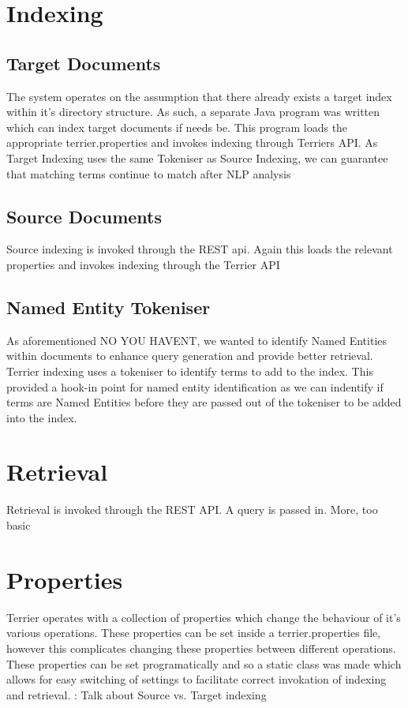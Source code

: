 \documentclass{l4proj}
\begin{document}
\section{Indexing}
\subsection{Target Documents}
The system operates on the assumption that there already exists a target index within it's directory structure.
As such, a separate Java program was written which can index target documents if needs be. This program loads the appropriate terrier.properties and invokes indexing through Terriers API. As Target Indexing uses the same Tokeniser as Source Indexing, we can guarantee that matching terms continue to match after NLP analysis

\subsection{Source Documents}
Source indexing is invoked through the REST api. Again this loads the relevant properties and invokes indexing through the Terrier API

\subsection{Named Entity Tokeniser}
As aforementioned NO YOU HAVENT, we wanted to identify Named Entities within documents to enhance query generation and provide better retrieval. Terrier indexing uses a tokeniser to identify terms to add to the index. This provided a hook-in point for named entity identification as we can indentify if terms are Named Entities before they are passed out of the tokeniser to be added into the index.

\section{Retrieval}
Retrieval is invoked through the REST API. A query is passed in. More, too basic

\section{Properties}
Terrier operates with a collection of properties which change the behaviour of it's various operations. These properties can be set inside a terrier.properties file, however this complicates changing these properties between different operations. These properties can be set programatically and so a static class was made which allows for easy switching of settings to facilitate correct invokation of indexing and retrieval. : Talk about Source vs. Target indexing
\end{document}

